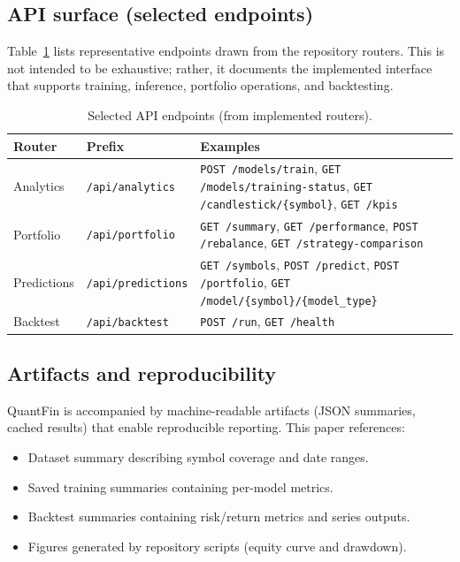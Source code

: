\documentclass{svproc}
\begin{document}
\subsection{API surface (selected endpoints)}\label{sec:api_surface}
Table~\ref{tab:api_surface} lists representative endpoints drawn from the repository routers. This is not intended to be exhaustive; rather, it documents the implemented interface that supports training, inference, portfolio operations, and backtesting.

\begin{table}[h!]
\centering
\caption{Selected API endpoints (from implemented routers).}
\label{tab:api_surface}
\begin{tabularx}{\textwidth}{|l|l|X|}
\hline
Router & Prefix & Examples \\
\hline
Analytics & \texttt{/api/analytics} & \texttt{POST /models/train}, \texttt{GET /models/training-status}, \texttt{GET /candlestick/\{symbol\}}, \texttt{GET /kpis} \\
Portfolio & \texttt{/api/portfolio} & \texttt{GET /summary}, \texttt{GET /performance}, \texttt{POST /rebalance}, \texttt{GET /strategy-comparison} \\
Predictions & \texttt{/api/predictions} & \texttt{GET /symbols}, \texttt{POST /predict}, \texttt{POST /portfolio}, \texttt{GET /model/\{symbol\}/\{model\_type\}} \\
Backtest & \texttt{/api/backtest} & \texttt{POST /run}, \texttt{GET /health} \\
\hline
\end{tabularx}
\end{table}

\subsection{Artifacts and reproducibility}\label{sec:artifacts}
QuantFin is accompanied by machine-readable artifacts (JSON summaries, cached results) that enable reproducible reporting. This paper references:
\begin{itemize}
\item Dataset summary describing symbol coverage and date ranges.
\item Saved training summaries containing per-model metrics.
\item Backtest summaries containing risk/return metrics and series outputs.
\item Figures generated by repository scripts (equity curve and drawdown).
\end{itemize}
\end{document}

